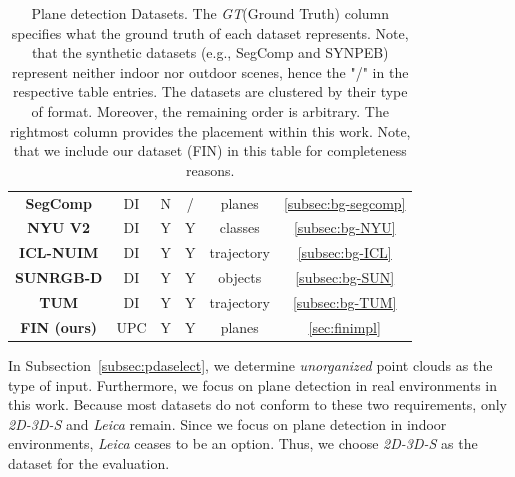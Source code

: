 \documentclass[main.tex]{subfiles}
\begin{document}
\begin{table}[H]
\begin{tabular}{c|c|c|c|c|c}
        \textbf{SegComp}     \cite{article}                                                                                                                                                   & DI                    & N             & /               & planes      & \ref{subsec:bg-segcomp}  \\
        \textbf{NYU V2}      \cite{10.1007/978-3-642-33715-4_54}                                                                                                                              & DI                    & Y             & Y               & classes     & \ref{subsec:bg-NYU}      \\
        \textbf{ICL-NUIM}    \cite{handa:etal:ICRA2014}                                                                                                                                       & DI                    & Y             & Y               & trajectory  & \ref{subsec:bg-ICL}      \\
        \textbf{SUNRGB-D}         \cite{7298655}                                                                                                                                              & DI                    & Y             & Y               & objects     & \ref{subsec:bg-SUN}      \\
        \textbf{TUM}         \cite{sturm12iros}                                                                                                                                               & DI                    & Y             & Y               & trajectory  & \ref{subsec:bg-TUM}      \\ \hline
        \textbf{FIN (ours)}                                                                                                                                                                   & UPC                   & Y             & Y               & planes      & \ref{sec:finimpl}
    \end{tabular}
    \caption[Popular Datasets]{Plane detection Datasets. The \textit{GT}(Ground Truth) column specifies what the ground truth of each dataset represents.
        Note, that the synthetic datasets (e.g., SegComp and SYNPEB) represent neither indoor nor outdoor scenes, hence the "/" in
        the respective table entries. The datasets are clustered by their type of format. Moreover, the remaining order is arbitrary.
        The rightmost column provides the placement within this work.
        Note, that we include our dataset (FIN) in this table for completeness reasons.
    }
    \label{tab:datasets}
\end{table}
In Subsection~\ref{subsec:pdaselect}, we determine \textit{unorganized} point clouds as the type of input. Furthermore, we focus on plane detection in real environments in this work.
Because most datasets do not conform to these two requirements, only \textit{2D-3D-S} and \textit{Leica} remain.
Since we focus on plane detection in indoor environments, \textit{Leica} ceases to be an option.
Thus, we choose \textit{2D-3D-S} as the dataset for the evaluation.
\end{document}
